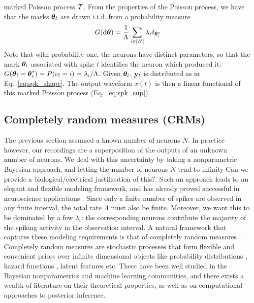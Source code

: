 marked Poisson process $\mathcal{T}$.  From the properties of the Poisson process, we have that the marks $\boldsymbol{\theta}_l$ are drawn i.i.d. from a probability measure 
\begin{align}
 G(\mathrm{d} \boldsymbol{\theta}) = \frac{1}{\Lambda}\sum_{i \in [N]} \lambda_i \delta_{\boldsymbol{\theta}^*_i}    \label{eq:mark_distr}
\end{align}
Note that with probability one, the neurons have distinct parameters, so that the mark $\boldsymbol{\theta}_l$ associated with spike $l$ identifies the
neuron which produced it: $G(\boldsymbol{\theta}_l = \boldsymbol{\theta}^*_i) = P(\nu_l= i) = \lambda_i/\Lambda$. Given $\boldsymbol{\theta}_l$, $\mathbf{y}_l$ is distributed as in
Eq.~\eqref{eq:spk_shape}. The output waveform $x(t)$ is then a linear functional of this marked Poisson process (Eq.~\eqref{eq:spk_sup}). 

\subsection{Completely random measures (CRMs)}

The previous section assumed a known number of neurons $N$. In practice however, our recordings are a superposition of the outputs of an unknown
number of neurons. We deal with this uncertainty by taking a nonparametric Bayesian approach, and letting the number of neurons $N$ tend to infinity
{\color{red} Can we provide a biological/electrical justification of this?}. 
Such an approach leads to an elegant and flexible modeling framework, and has  already proved successful in neuroscience applications
\citep{WoodBla2008}.
Since only a finite number of spikes are observed in any finite interval, the total rate $\Lambda$ must 
also be finite. Moreover, we want this to be dominated by a few $\lambda_i$: the corresponding neurons contribute the majority of the spiking
activity in the observation interval. 
A natural framework that captures these  modeling requirements is that of completely random measures \citep{Kingman:PJM67}.
Completely random measures are stochastic processes that form flexible and convenient priors over
infinite dimensional objects like probability distributions \citep{JamesLP09}, hazard functions \citep{Hjo1990}, latent features \citep{ThiJor2007} etc. 
These have been well studied in the Bayesian nonparametrics and machine learning communities, and there exists a wealth of literature on
their theoretical properties, as well as on computational approaches to posterior inference.

